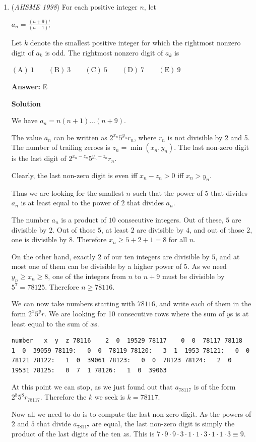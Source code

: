 \begin{enumerate}
	\item (\textit{AHSME 1998}) For each positive integer $n$, let 


 $a_n = \frac{(n+9)!}{(n-1)!}$

 Let $k$ denote the smallest positive integer for which the rightmost nonzero digit of $a_k$ is odd. The rightmost nonzero digit of $a_k$ is


 $\mathrm{(A) \ }1 \qquad \mathrm{(B) \ }3 \qquad \mathrm{(C) \ }5 \qquad \mathrm{(D) \ } 7 \qquad \mathrm{(E) \ } 9$

 \textbf{Answer: }E



\textbf{Solution}

We have $a_n = n(n+1)\dots (n+9)$.

 The value $a_n$ can be written as $2^{x_n} 5^{y_n} r_n$, where $r_n$ is not divisible by 2 and 5. The number of trailing zeroes is $z_n = \min(x_n,y_n)$. The last non-zero digit is the last digit of $2^{x_n-z_n} 5^{y_n-z_n} r_n$.

 Clearly, the last non-zero digit is even iff $x_n - z_n > 0$ iff $x_n > y_n$.

 Thus we are looking for the smallest $n$ such that the power of $5$ that divides $a_n$ is at least equal to the power of $2$ that divides $a_n$.

 The number $a_n$ is a product of $10$ consecutive integers. Out of these, $5$ are divisible by $2$. Out of those $5$, at least $2$ are divisible by $4$, and out of those $2$, one is divisible by $8$. Therefore $x_n\geq 5+2+1=8$ for all $n$.

 On the other hand, exactly $2$ of our ten integers are divisible by $5$, and at most one of them can be divisible by a higher power of $5$. As we need $y_n\geq x_n\geq 8$, one of the integers from $n$ to $n+9$ must be divisible by $5^7 = 78125$. Therefore $n\geq 78116$. 

 We can now take numbers starting with $78116$, and write each of them in the form $2^x 5^y r$. We are looking for 10 consecutive rows where the sum of $y$s is at least equal to the sum of $x$s.

 \begin{verbatim}
number   x  y  z 78116    2  0  19529 78117    0  0  78117 78118    1  0  39059 78119:   0  0  78119 78120:   3  1  1953 78121:   0  0  78121 78122:   1  0  39061 78123:   0  0  78123 78124:   2  0  19531 78125:   0  7  1 78126:   1  0  39063
\end{verbatim}

At this point we can stop, as we just found out that $a_{78117}$ is of the form $2^8 5^8 r_{78117}$. Therefore the $k$ we seek is $k=78117$.

 Now all we need to do is to compute the last non-zero digit. As the powers of $2$ and $5$ that divide $a_{78117}$ are equal, the last non-zero digit is simply the product of the last digits of the ten $z$s. This is $7\cdot 9\cdot 9\cdot 3\cdot 1\cdot 1\cdot 3\cdot 1\cdot 1\cdot 3 \equiv\boxed{9}$.

 


\end{enumerate}